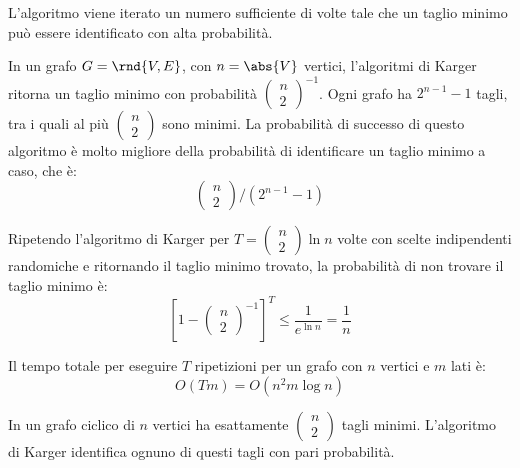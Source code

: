 \documentclass[\main/main.tex]{subfiles}
\begin{document}
\begin{multicols}{2}
\begin{definition}
    L'algoritmo viene iterato un numero sufficiente di volte tale che un taglio minimo può essere identificato con alta probabilità.
\end{definition}
\begin{analysis}
    In un grafo \(G = \rnd{V,E}\), con \(n = \abs{V}\) vertici, l'algoritmi di Karger ritorna un taglio minimo con probabilità \(\left(\begin{array}{l}{n} \\ {2}\end{array}\right)^{-1}\). Ogni grafo ha \(2^{n-1}-1\) tagli, tra i quali al più \(\left(\begin{array}{l}{n} \\ {2}\end{array}\right)\) sono minimi. La probabilità di successo di questo algoritmo è molto migliore della probabilità di identificare un taglio minimo a caso, che è:
    \[
        \left(\begin{array}{l}{n} \\ {2}\end{array}\right) /\left(2^{n-1}-1\right)
    \]
\end{analysis}
\vfill\null
\columnbreak
\begin{observation}
    Ripetendo l'algoritmo di Karger per \(T=\left(\begin{array}{l}{n} \\ {2}\end{array}\right) \ln n\) volte con scelte indipendenti randomiche e ritornando il taglio minimo trovato, la probabilità di non trovare il taglio minimo è:
    \[
        \left[1-\left(\begin{array}{c}{n} \\ {2}\end{array}\right)^{-1}\right]^{T} \leq \frac{1}{e^{\ln n}}=\frac{1}{n}
    \]
\end{observation}
\begin{complexity}
    Il tempo totale per eseguire \(T\) ripetizioni per un grafo con \(n\) vertici e \(m\) lati è:
    \[
        O(T m)=O\left(n^{2} m \log n\right)
    \]
\end{complexity}
\begin{analysis}
    In un grafo ciclico di \(n\) vertici ha esattamente \(\left(\begin{array}{l}{n} \\ {2}\end{array}\right)\) tagli minimi. L'algoritmo di Karger identifica ognuno di questi tagli con pari probabilità.
    

\end{analysis}
\end{multicols}
\end{document}
